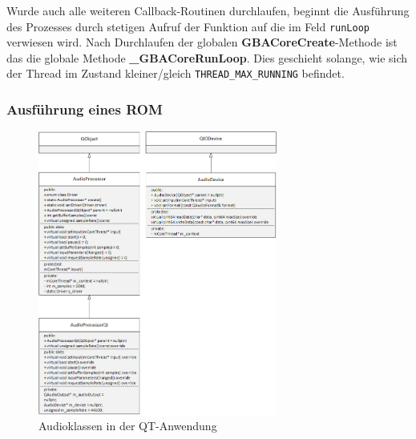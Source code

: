 \documentclass[11pt,a4paper]{scrartcl}
\begin{document}
Wurde auch alle weiteren Callback-Routinen durchlaufen, beginnt die Ausf\"uhrung des Prozesses durch stetigen Aufruf der Funktion auf die im Feld \verb|runLoop| verwiesen wird. Nach Durchlaufen der globalen \textbf{GBACoreCreate}-Methode ist das die globale Methode \textbf{{\_}GBACoreRunLoop}. Dies geschieht solange, wie sich der Thread im Zustand kleiner/gleich \verb|THREAD_MAX_RUNNING| befindet.

\newpage

\subsubsection{Ausf\"uhrung eines ROM}



















\newpage

\begin{figure}[h]
    \centering
    \includegraphics[width=0.7\textwidth]{QT_Klassendiagramm}
    \caption{Audioklassen in der QT-Anwendung}
    \label{fig:qtclassdiagramm}
\end{figure}


\newpage


\end{document}
